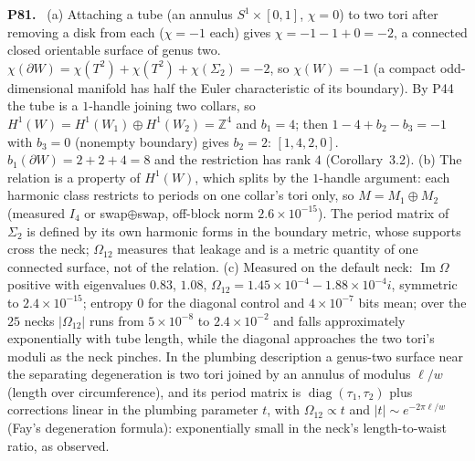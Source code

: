 \documentclass[11pt]{article}
\newcommand{\Z}{\mathbb{Z}}
\newenvironment{solution}[1]{\medskip\noindent\textbf{P#1.}\ }{\par\medskip}
\begin{document}
\begin{solution}{81}
(a) Attaching a tube (an annulus $S^1\times[0,1]$, $\chi = 0$) to two tori
after removing a disk from each ($\chi = -1$ each) gives $\chi = -1-1+0 = -2$,
a connected closed orientable surface of genus two. $\chi(\partial W) = \chi(T^2)+\chi(T^2)+\chi(\Sigma_2) = -2$,
so $\chi(W) = -1$ (a compact odd-dimensional manifold has half the Euler
characteristic of its boundary). By P44 the tube is a $1$-handle joining
two collars, so $H^1(W) = H^1(W_1)\oplus H^1(W_2) = \Z^4$ and $b_1 = 4$; then
$1-4+b_2-b_3 = -1$ with $b_3 = 0$ (nonempty boundary) gives $b_2 = 2$:
$[1,4,2,0]$. $b_1(\partial W) = 2+2+4 = 8$ and the restriction has rank $4$
(Corollary~3.2). (b) The relation is a property of $H^1(W)$, which splits by
the $1$-handle argument: each harmonic class restricts to periods on one
collar's tori only, so $M = M_1\oplus M_2$ (measured $I_4$ or swap$\oplus$swap,
off-block norm $2.6\times10^{-15}$). The period matrix of $\Sigma_2$ is
defined by its own harmonic forms in the boundary metric, whose supports
cross the neck; $\Omega_{12}$ measures that leakage and is a metric quantity
of one connected surface, not of the relation. (c) Measured on the default
neck: $\operatorname{Im}\Omega$ positive with eigenvalues $0.83$, $1.08$,
$\Omega_{12} = 1.45\times10^{-4}-1.88\times10^{-4}i$, symmetric to $2.4\times10^{-15}$;
entropy $0$ for the diagonal control and $4\times10^{-7}$ bits mean; over the
$25$ necks $|\Omega_{12}|$ runs from $5\times10^{-8}$ to $2.4\times10^{-2}$ and
falls approximately exponentially with tube length, while the diagonal
approaches the two tori's moduli as the neck pinches. In the plumbing
description a genus-two surface near the separating degeneration is two tori
joined by an annulus of modulus $\ell/w$ (length over circumference), and
its period matrix is $\operatorname{diag}(\tau_1,\tau_2)$ plus corrections
linear in the plumbing parameter $t$, with $\Omega_{12}\propto t$ and
$|t|\sim e^{-2\pi\ell/w}$ (Fay's degeneration formula): exponentially small
in the neck's length-to-waist ratio, as observed.
\end{solution}
\end{document}
